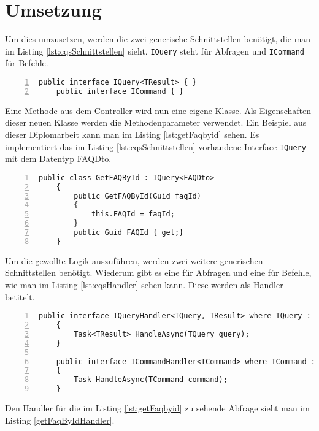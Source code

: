 \section{Umsetzung}
Um dies umzusetzen, werden die zwei generische Schnittstellen benötigt, die man im Listing \ref{lst:cqsSchnittstellen} sieht. \texttt{IQuery} steht für Abfragen und \texttt{ICommand} für Befehle.
\begin{lstlisting}[caption={CQS-Schnittstellen},captionpos=b, numbers=left, backgroundcolor=\color{black!10},language={[Sharp]C}, label={lst:cqsSchnittstellen}]
	public interface IQuery<TResult> { }
	public interface ICommand { }
\end{lstlisting}
Eine Methode aus dem Controller wird nun eine eigene Klasse. Als Eigenschaften dieser neuen Klasse werden die Methodenparameter verwendet. Ein Beispiel aus dieser Diplomarbeit kann man im Listing \ref{lst:getFaqbyid} sehen. Es implementiert das im Listing \ref{lst:cqsSchnittstellen} vorhandene Interface \texttt{IQuery} mit dem Datentyp FAQDto.
\begin{lstlisting}[caption={CQS-Query Beispiel},captionpos=b, numbers=left, backgroundcolor=\color{black!10},language={[Sharp]C}, label={lst:getFaqbyid}]
	public class GetFAQById : IQuery<FAQDto>
	{
		public GetFAQById(Guid faqId)
		{
			this.FAQId = faqId;
		}
		public Guid FAQId { get;}
	}
\end{lstlisting}
Um die gewollte Logik auszuführen, werden zwei weitere generischen Schnittstellen benötigt. Wiederum gibt es eine für Abfragen und eine für Befehle, wie man im Listing \ref{lst:cqsHandler} sehen kann. Diese werden als Handler betitelt. \autocite{cqsSOLIDeArchitektur}
\begin{lstlisting}[caption={CQS-Handler},captionpos=b, numbers=left, backgroundcolor=\color{black!10},language={[Sharp]C}, label={lst:cqsHandler}]
	public interface IQueryHandler<TQuery, TResult>	where TQuery : IQuery<TResult>
	{
		Task<TResult> HandleAsync(TQuery query);
	}
	
	public interface ICommandHandler<TCommand> where TCommand : ICommand
	{
		Task HandleAsync(TCommand command);
	}
\end{lstlisting}
Den Handler für die im Listing \ref{lst:getFaqbyid} zu sehende Abfrage sieht man im Listing \ref{getFaqByIdHandler}.
